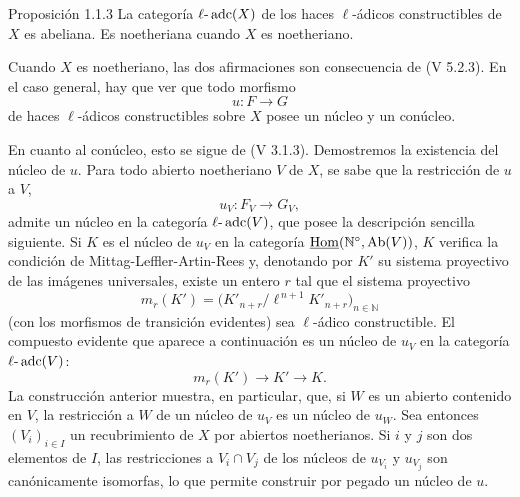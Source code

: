 \begin{statement}{Proposición 1.1.3}
La categoría \(\ell\text{-}\operatorname{adc}(X)\) de los haces \(\ell\)-ádicos constructibles de \(X\) es abeliana. Es noetheriana cuando \(X\) es noetheriano.
\end{statement}

\begin{prooftext}[Demostración]
Cuando \(X\) es noetheriano, las dos afirmaciones son consecuencia de (V 5.2.3). En el caso general, hay que ver que todo morfismo
\[
u:F\longrightarrow G
\]
de haces \(\ell\)-ádicos constructibles sobre \(X\) posee un núcleo y un conúcleo.

En cuanto al conúcleo, esto se sigue de (V 3.1.3). Demostremos la existencia del núcleo de \(u\). Para todo abierto noetheriano \(V\) de \(X\), se sabe que la restricción de \(u\) a \(V\),
\[
u_V:F_V\longrightarrow G_V,
\]
admite un núcleo en la categoría \(\ell\text{-}\operatorname{adc}(V)\), que posee la descripción sencilla siguiente. Si \(K\) es el núcleo de \(u_V\) en la categoría \(\underline{\operatorname{Hom}}(\mathbb N^\circ,\operatorname{Ab}(V))\), \(K\) verifica la condición de Mittag-Leffler-Artin-Rees y, denotando por \(K'\) su sistema proyectivo de las imágenes universales, existe un entero \(r\) tal que el sistema proyectivo
\[
m_r(K')=\bigl(K'_{n+r}/\ell^{\,n+1}K'_{n+r}\bigr)_{n\in\mathbb N}
\]
(con los morfismos de transición evidentes) sea \(\ell\)-ádico constructible. El compuesto evidente que aparece a continuación es un núcleo de \(u_V\) en la categoría \(\ell\text{-}\operatorname{adc}(V)\):
\[
m_r(K')\longrightarrow K'\longrightarrow K.
\]
La construcción anterior muestra, en particular, que, si \(W\) es un abierto contenido en \(V\), la restricción a \(W\) de un núcleo de \(u_V\) es un núcleo de \(u_W\). Sea entonces \((V_i)_{i\in I}\) un recubrimiento de \(X\) por abiertos noetherianos. Si \(i\) y \(j\) son dos elementos de \(I\), las restricciones a \(V_i\cap V_j\) de los núcleos de \(u_{V_i}\) y \(u_{V_j}\) son canónicamente isomorfas, lo que permite construir por pegado un núcleo de \(u\).
\end{prooftext}
